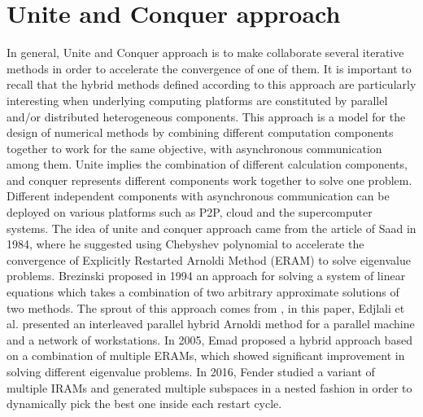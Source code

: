 \vspace{0.6in}

\section{Unite and Conquer approach}\label{Unite and Conquer approach}

In general, Unite and Conquer approach is to make collaborate several iterative methods in order to accelerate the convergence of one of them. It is important to recall that the hybrid methods defined according to this approach are particularly interesting when underlying computing platforms are constituted by parallel and/or distributed heterogeneous components. This approach is a model for the design of numerical methods by combining different computation components together to work for the same objective, with asynchronous communication among them. Unite implies the combination of different calculation components, and conquer represents different components work together to solve one problem. Different independent components with asynchronous communication can be deployed on various platforms such as P2P, cloud and the supercomputer systems. The idea of unite and conquer approach came from the article of Saad \cite{saad1984chebyshev} in 1984, where he suggested using Chebyshev polynomial to accelerate the convergence of Explicitly Restarted Arnoldi Method (ERAM) to solve eigenvalue problems. Brezinski \cite{brezinski1994hybrid} proposed in 1994 an approach for solving a system of linear equations which takes a combination of two arbitrary approximate solutions of two methods. The sprout of this approach comes from \cite{edjlali1996interleaved}, in this paper, Edjlali et al. presented an interleaved parallel hybrid Arnoldi method for a parallel machine and a network of workstations. In 2005, Emad \cite{emad2005multiple} proposed a hybrid approach based on a combination of multiple ERAMs, which showed significant improvement in solving different eigenvalue problems. In 2016, Fender \cite{fender2016leveraging} studied a variant of multiple IRAMs and generated multiple subspaces in a nested fashion in order to dynamically pick the best one inside each restart cycle.

